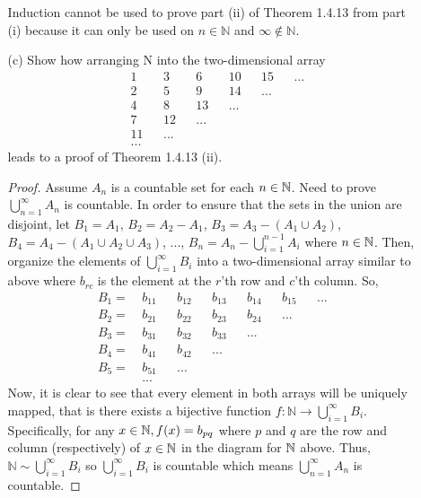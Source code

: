 \documentclass[12pt,letterpaper]{article}
\begin{document}
\begin{itemize}[leftmargin=!,labelindent=5pt]
\begin{itemize}
                Induction cannot be used to prove part (ii) of Theorem 1.4.13 from part (i) because it can only be used on $n \in \mathbb{N}$ and $\infty \notin \mathbb{N}$.
                \item [(c)] Show how arranging N into the two-dimensional array
                    \begin{align*}
                        &1 && 3 && 6 && 10 && 15 && ... \\
                        &2 && 5 && 9 && 14 && ... \\
                        &4 && 8 && 13 && ... \\
                        &7 && 12 && ... \\
                        &11 && ... \\
                        &...
                    \end{align*}
                    leads to a proof of Theorem 1.4.13 (ii).
                    
                    \begin{proof}
                        Assume $A_n$ is a countable set for each $n \in \mathbb{N}$.
                        Need to prove $\bigcup\limits_{n=1}^{\infty} A_n$ is countable.
                        In order to ensure that the sets in the union are disjoint, 
                        let $B_1 = A_1$, $B_2 = A_2 - A_1$, $B_3 = A_3 - (A_1 \cup A_2)$, $B_4 = A_4 - (A_1 \cup A_2 \cup A_3)$, ..., $B_n = A_n - \bigcup\limits_{i=1}^{n-1} A_i$ where $n\in \mathbb{N}$.
                        Then, organize the elements of $\bigcup\limits_{i=1}^{\infty} B_i$ into a two-dimensional array similar to above where $b_{rc}$ is the element at the $r$'th row and $c$'th column.
                        So, \begin{align*}
                            B_1 = \ & b_{11} && b_{12} && b_{13} && b_{14} && b_{15} && ... \\
                            B_2 = \ & b_{21} && b_{22} && b_{23} && b_{24} && ... \\
                            B_3 = \ & b_{31} && b_{32} && b_{33} && ... \\
                            B_4 = \ & b_{41} && b_{42} && ... \\
                            B_5 = \ & b_{51} && ... \\
                            &...
                        \end{align*}
                        Now, it is clear to see that every element in both arrays will be uniquely mapped, that is there exists a bijective function $f:\mathbb{N} \to \bigcup\limits_{i=1}^{\infty} B_i$.
                        Specifically, for any $x \in \mathbb{N}, f(x) = b_{pq}$ where $p$ and $q$ are the row and column (respectively) of $x\in \mathbb{N}$ in the diagram for $\mathbb{N}$ above.
                        Thus, $\mathbb{N} \sim \bigcup\limits_{i=1}^{\infty} B_i$ so $\bigcup\limits_{i=1}^{\infty} B_i$ is countable which means $\bigcup\limits_{n=1}^{\infty} A_n$ is countable.
                    \end{proof}
            \end{itemize}
\end{itemize}
\end{document}
